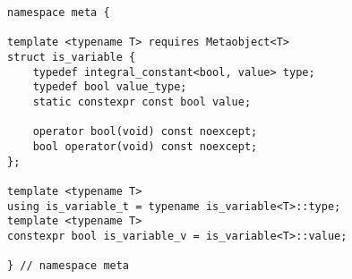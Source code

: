 
\begin{verbatim}
namespace meta {

template <typename T> requires Metaobject<T>
struct is_variable {
	typedef integral_constant<bool, value> type;
	typedef bool value_type;
	static constexpr const bool value;

	operator bool(void) const noexcept;
	bool operator(void) const noexcept;
};

template <typename T>
using is_variable_t = typename is_variable<T>::type;
template <typename T>
constexpr bool is_variable_v = is_variable<T>::value;

} // namespace meta
\end{verbatim}
